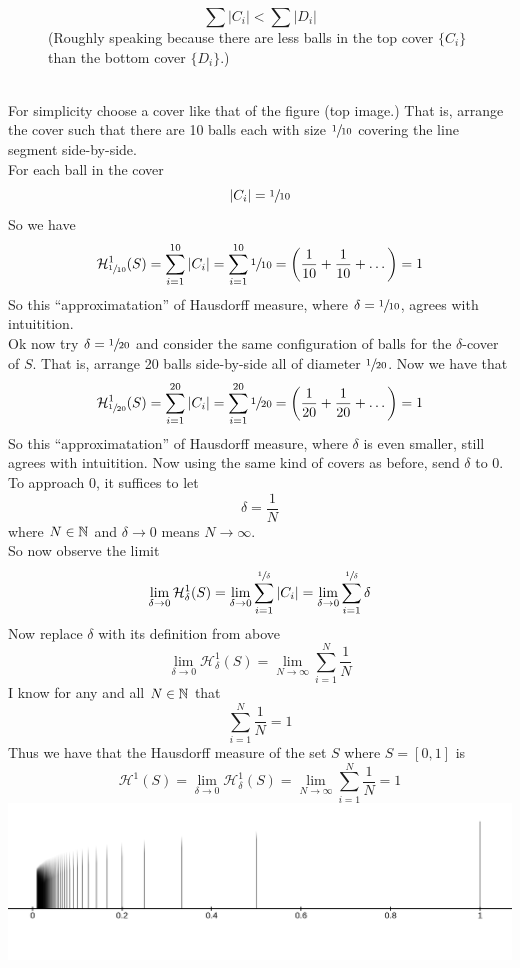 \documentclass[11pt]{ekblite}
\begin{document}
\begin{example}
\begin{figure}[h]
		\[\sum |C_i| < \sum |D_i|\]
		(Roughly speaking because there are less balls in the top cover $\{C_i\}$ than the bottom cover $\{D_i\}$.) 
	\end{figure}
	\\[0.2in]For simplicity choose a cover like that of the figure (top image.) That is, arrange the cover such that there are 10 balls each with size $\sfrac{1}{10}$ covering the line segment side-by-side.
	\\[0.2in]For each ball in the cover
	\[|C_i| = \sfrac{1}{10}\]
	So we have
	\[\mathcal{H}_{\sfrac{1}{10}}^{1} (S) = \sum_{i=1}^{10} |C_i| = \sum_{i=1}^{10} \sfrac{1}{10} = \left( \frac{1}{10} + \frac{1}{10} + \dots \right) = 1\]
	So this ``approximatation'' of Hausdorff measure, where $\delta = \sfrac{1}{10}$, agrees with intuitition.
	\\[0.2in]Ok now try $\delta = \sfrac{1}{20}$ and consider the same configuration of balls for the $\delta$-cover of $S$. That is, arrange 20 balls side-by-side all of diameter $\sfrac{1}{20}$. Now we have that
	\[\mathcal{H}_{\sfrac{1}{20}}^{1} (S) = \sum_{i=1}^{20} |C_i| = \sum_{i=1}^{20} \sfrac{1}{20} = \left( \frac{1}{20} + \frac{1}{20} + \dots \right) = 1\]
	So this ``approximatation'' of Hausdorff measure, where $\delta$ is even smaller, still agrees with intuitition.
	Now using the same kind of covers as before, send $\delta$ to 0. To approach 0, it suffices to let
	\[\delta = \frac{1}{N}\]
	where $N \in \mathbb{N}$ and $\delta \rightarrow 0$ means $N \rightarrow \infty$.
	\\[0.2in]So now observe the limit
	\[\lim_{\delta \rightarrow 0} \mathcal{H}_{\delta}^{1} (S) = \lim_{\delta \rightarrow 0} \sum_{i=1}^{\sfrac{1}{\delta}} |C_i| = \lim_{\delta \rightarrow 0} \sum_{i=1}^{\sfrac{1}{\delta}} \delta\]
	Now replace $\delta$ with its definition from above 
	\[\lim_{\delta \rightarrow 0} \mathcal{H}_{\delta}^{1} (S) = \lim_{N \rightarrow \infty} \sum_{i=1}^{N} \frac{1}{N}\]
	I know for any and all $N \in \mathbb{N}$ that
	\[\sum_{i=1}^{N} \frac{1}{N} = 1\]
	Thus we have that the Hausdorff measure of the set $S$ where $S = [0,1]$ is
	\[\mathcal{H}^1 (S) = \lim_{\delta \rightarrow 0} \mathcal{H}_{\delta}^{1} (S) = \lim_{N \rightarrow \infty} \sum_{i=1}^{N} \frac{1}{N} = 1\]
	\includegraphics[scale=0.25]{img/c21.jpg}
\end{example}
\newpage
\end{document}
